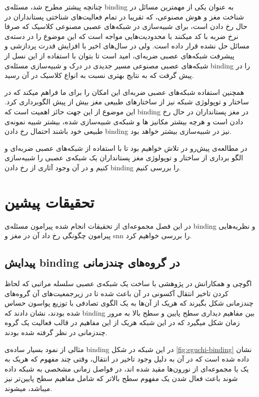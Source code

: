 \documentclass[12pt]{report}
\begin{document}
	چنانچه پیشتر مطرح شد، مسئله‌ی \gls{binding} به عنوان یکی از مهمترین مسائل در شناخت مغز و هوش مصنوعی، که تقریبا در تمام فعالیت‌های شناختی پستانداران در حال رخ دادن است، برای شبیه‌سازی در شبکه‌های عصبی مصنوعی کلاسیک که صرفا نرخ ضربه با کد میکنند با محدودیت‌هایی مواجه است \cite{vonderMalsburg1999} که این موضوع را در دسته‌ی مسائل حل نشده قرار داده است. ولی در سال‌های اخیر با افزایش قدرت پردازشی و پیشرفت شبکه‌های عصبی ضربه‌ای‌، امید است تا بتوان با استفاده از این نسل از شبکه‌های عصبی مصنوعی مسیر جدیدی در درک و شبیه‌سازی مسئله‌ی \gls{binding} را در پیش گرفت که به نتایج بهتری نسبت به انواع کلاسیک در آن رسید.
	
	همچنین استفاده شبکه‌های عصبی ضربه‌ای این امکان را برای ما فراهم میکند که در ساختار و توپولوژی شبکه نیز از ساختار‌های طبیعی مغز بیش از پیش الگوبرداری کرد. این موضوع از این جهت  حائز اهمیت است که \gls{binding} در مغز پستانداران در حال رخ دادن است و هرچه بیشتر مکانیز ها و شبکه‌ی شبیه‌سازی شده، بیشتر شبیه نمونه‌ی طبیعی خود باشند احتمال رخ دادن \gls{binding} نیز در شبیه‌سازی بیشتر خواهد بود.
	
	در مطالعه‌ی پیش‌رو در تلاش خواهیم بود تا با استفاده از شبکه‌های عصبی ضربه‌ای و الگو برداری از ساختار و توپولوژی مغز پستانداران یک شبکه‌ی عصبی را شبیه‌سازی کنیم و در آن وجود آثاری از رخ دادن \gls{binding} را بررسی کنیم.
	
	
	\chapter{تحقیقات پیشین}
	
	در این فصل مجموعه‌ای از تحقیقات انجام شده پیرامون مسئله‌ی \gls{binding} و نظریه‌هایی پیرامون چگونگی رخ داد آن در مغز و \gls{snn} را بررسی خواهیم کرد.
	
	
	\section{پیدایش \gls{binding} در گروه‌های چندزمانی}
	اگوچی و همکارانش در پژوهشی
	\cite{EGUCHI2018a}
	با ساخت یک شبکه‌ی عصبی سلسله مراتبی که لحاظ کردن تاخیر انتقال آکسونی در آن باعث شده تا در زیرجمعیت‌های آن گروه‌های چندزمانی\cite{Izhikevich2006-dy} شکل بگیرند که هریک از آن‌ها به یک الگوی تصادفی با توزیع پواسون حساس شده بودند، نشان دادند که \gls{binding} بین مفاهیم دیداری سطح پایین و سطح بالا به مرور زمان شکل میگیرد که در این شبکه هریک از این مفاهیم در قالب فعالیت یک گروه چندزمانی در نظر گرفته شده بودند.
	
	مثالی از نمود بسیار ساده‌ی \gls{binding} در این شبکه در شکل \ref{fig:eguchi-binding} نشان داده شده است که در آن به دلیل وجود تاخیر در انتقال، وقتی چند مفهوم که هریک به یک یا مجموعه‌ای از نورون‌ها مقید شده اند، در فواصل زمانی مشخصی به شبکه داده شوند باعث فعال شدن یک مفهوم سطح بالاتر که شامل مفاهیم سطح پایین‌تر نیز میباشد، میشوند. 
	
\end{document}
